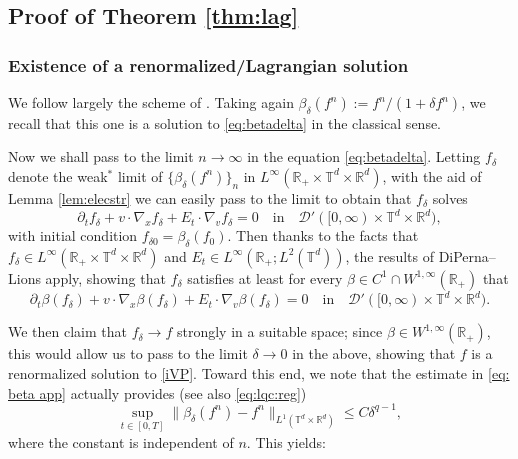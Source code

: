 \documentclass[11pt,reqno,a4paper]{amsart}
\newcommand{\R}{\mathbb{R}}
\newcommand{\p}{\partial}
\theoremstyle{definition}
\theoremstyle{remark}
\numberwithin{equation}{section}
\newcommand{\T} {\mathbb T}
\newcommand{\calD}{\mathcal D}
\begin{document}
%
%
%
%
%

\subsection{Proof of Theorem \ref{thm:lag}}

\subsubsection{Existence of a renormalized/Lagrangian solution}

We follow largely the scheme of \cite{dipernalions1989a}. Taking again $\beta_\delta(f^n) := f^n/(1+\delta f^n)$, we recall that this one is a solution to \eqref{eq:betadelta} in the classical sense.

Now we shall pass to the limit $n\to\infty$ in the equation \eqref{eq:betadelta}. Letting $f_\delta$ denote the weak$^*$ limit of $\{\beta_\delta(f^n)\}_n$ in $L^\infty(\R_+\times \T^d \times \R^d)$, with the aid of Lemma \ref{lem:elecstr} we can easily pass to the limit to obtain that $f_\delta$ solves
\begin{equation}\label{eq:fdel}
    \p_t f_\delta + v\cdot \nabla_x f_\delta + E_t\cdot \nabla_v f_\delta = 0 \quad \text{in} \quad \calD'([0,\infty)\times \T^d\times\R^d),
\end{equation}
with initial condition $f_{\delta 0} = \beta_\delta(f_0)$. Then thanks to the facts that $f_\delta\in L^\infty(\R_+\times\T^d\times\R^d)$ and $E_t\in L^\infty(\R_+;L^2(\T^d))$, the results of DiPerna--Lions \cite{dipernalions1989b} apply, showing that $f_\delta$ satisfies at least for every $\beta\in C^1\cap W^{1,\infty}(\R_+)$ that
\begin{equation}\label{eq:betafdel}
    \p_t \beta(f_\delta) + v\cdot \nabla_x \beta(f_\delta) + E_t \cdot \nabla_v \beta(f_\delta) = 0 \quad \text{in} \quad \calD'([0,\infty)\times \T^d\times\R^d).
\end{equation}

We then claim that $f_\delta \to f$ strongly in a suitable space; since $\beta\in W^{1,\infty}(\R_+)$, this would allow us to pass to the limit $\delta\to 0$ in the above, showing that $f$ is a renormalized solution to \eqref{iVP}. Toward this end, we note that the estimate in \eqref{eq: beta app} actually provides (see also \eqref{eq:lqc:reg})
\begin{equation}\label{eq:carbonara}
    \sup_{t\in [0,T]} \|\beta_\delta(f^n) - f^n \|_{L^1(\T^d\times \R^d)} \le C\delta^{q-1},
\end{equation}
where the constant is independent of $n$. This yields:
\end{document}
